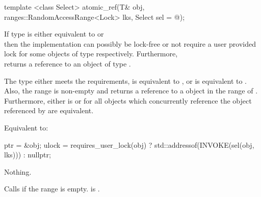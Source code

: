 \begin{addedblock}
\begin{itemdecl}
template <class Select>
atomic_ref(T& obj, ranges::RandomAccessRange<Lock> lks, 
  Select sel = @\unspec@ );
\end{itemdecl}

\begin{itemdescr}
\pnum
\mandates If type  is either equivalent to  
or \\  then the implementation can possibly be
lock-free or not require a user provided lock for some objects of type  
respectively. Furthermore, \\
 returns
a reference to an object of type .

\pnum
\expects The type  either meets the  requirements, 
 is equivalent to , or
 is equivalent to .
Also, the range  is non-empty and  returns a
reference to a  object in the range of . 
Furthermore, either  is  or
for all  objects which concurrently reference the object referenced
by  are equivalent.

\pnum
\effects Equivalent to:
\begin{codeblock}
  ptr = &obj;
  ulock = requires_user_lock(obj) ? 
    std::addressof(INVOKE(sel(obj, lks))) : nullptr;
\end{codeblock}

\pnum
\throws Nothing.

\pnum
\remarks Calls  if the range  is empty.
 is .

\end{itemdescr}
\end{addedblock}


